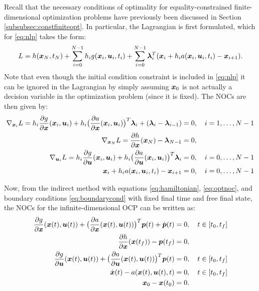 Recall that the necessary conditions of optimality for equality-constrained finite-dimensional optimization problems have previously been discussed in Section \ref{subsubsec:constfiniteopt}. In particular, the Lagrangian is first formulated, which for \eqref{eq:nlp} takes the form:
\begin{equation*}
L = h(\bm{x}_N,t_N) + \sum_{i=0}^{N-1} h_i g(\bm{x}_i,\bm{u}_i,t_i) + \sum_{i=0}^{N-1} \bm{\lambda}_i^T(\bm{x}_{i} + h_ia(\bm{x}_i, \bm{u}_i, t_i) - \bm{x}_{i+1}).
\end{equation*}
Note that even though the initial condition constraint is included in \eqref{eq:nlp} it can be ignored in the Lagrangian by simply assuming $\bm{x}_0$ is not actually a decision variable in the optimization problem (since it is fixed).
The NOCs are then given by:
\begin{equation} \label{eq:dirnoc}
\begin{split}
\nabla_{\bm{x}_i} L = h_i \frac{\partial g}{\partial \bm{x}}(\bm{x}_i, \bm{u}_i) + h_i\big(\frac{\partial a}{\partial \bm{x}}(\bm{x}_i, \bm{u}_i)\big)^T \bm{\lambda}_i + (\bm{\lambda}_i - \bm{\lambda}_{i-1}) &= 0, \quad i = 1,\dots,N-1 \\
\nabla_{\bm{x}_N} L = \frac{\partial h}{\partial \bm{x}}(\bm{x}_N) - \bm{\lambda}_{N-1} &= 0, \\
\nabla_{\bm{u}_i} L = h_i \frac{\partial g}{\partial \bm{u}}(\bm{x}_i, \bm{u}_i) + h_i\big(\frac{\partial a}{\partial \bm{u}}(\bm{x}_i, \bm{u}_i)\big)^T \bm{\lambda}_i &= 0, \quad i = 0, \dots, N-1\\
\bm{x}_{i} + h_ia(\bm{x}_i, \bm{u}_i, t_i) - \bm{x}_{i+1} &= 0, \quad i = 0,\dots,N-1\\
\end{split}
\end{equation}

Now, from the indirect method with equations \eqref{eq:hamiltonian}, \eqref{eq:optnoc}, and boundary conditions \eqref{eq:boundarycond} with fixed final time and free final state, the NOCs for the infinite-dimensional OCP can be written as:
\begin{equation} \label{eq:indinoc}
\begin{split}
\frac{\partial g}{\partial \bm{x}}(\bm{x}(t), \bm{u}(t)) + \big(\frac{\partial a}{\partial \bm{x}}(\bm{x}(t), \bm{u}(t))\big)^T \bm{p}(t) + \dot{\bm{p}}(t) &= 0, \quad t \in [t_0,t_f] \\
\frac{\partial h}{\partial \bm{x}}(\bm{x}(t_f)) - \bm{p}(t_f) &= 0, \\
\frac{\partial g}{\partial \bm{u}}(\bm{x}(t), \bm{u}(t)) + \big(\frac{\partial a}{\partial \bm{u}}(\bm{x}(t), \bm{u}(t))\big)^T \bm{p}(t) &= 0, \quad t \in [t_0, t_f]\\
\dot{\bm{x}}(t) - a(\bm{x}(t), \bm{u}(t), t) &= 0, \quad t\in[t_0,t_f]\\
\bm{x}_0 - \bm{x}(t_0) &= 0.
\end{split}
\end{equation}

